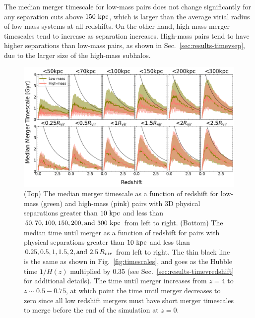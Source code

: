 \documentclass[twocolumn,linenumbers]{aastex631}
\begin{document}
        The median merger timescale for low-mass pairs does not change significantly for any separation cuts above $150\,\mathrm{\,kpc}$, which is larger than the average virial radius of low-mass systems at all redshifts. 
        On the other hand, high-mass merger timescales tend to increase as separation increases.
        High-mass pairs tend to have higher separations than low-mass pairs, as shown in Sec.~\ref{sec:results-timevsep}, due to the larger size of the high-mass subhalos. 
    \begin{figure}[htb]
        \centering
        \includegraphics[width=\textwidth]{plots/bet-on-it/8_timescale_sepcut.png}
        \caption{(Top) The median merger timescale as a function of redshift for low-mass (green) and high-mass (pink) pairs with 3D physical separations greater than $10\,\mathrm{\,kpc}$ and less than $50,70,100,150,200,\mbox{and }300\,\mathrm{\,kpc}$ from left to right. 
        (Bottom) The median time until merger as a function of redshift for pairs with physical separations greater than $10\,\mathrm{\,kpc}$ and less than $0.25, 0.5, 1, 1.5, 2,\mbox{and }2.5\,R_{vir}$ from left to right. 
        The thin black line is the same as shown in Fig.~\ref{fig:timescales}, and goes as the Hubble time $1/H(z)$ multiplied by 0.35 (see Sec.~\ref{sec:results-timevredshift} for additional details).
        The time until merger increases from $z=4$ to $z\sim0.5-0.75$, at which point the time until merger decreases to zero since all low redshift mergers must have short merger timescales to merge before the end of the simulation at $z=0$. 
        }
        \label{fig:timescales-sep}
    \end{figure}  
\end{document}
